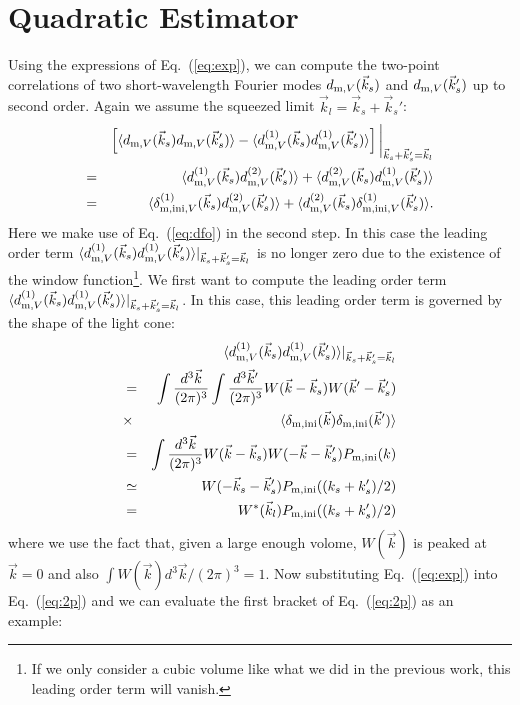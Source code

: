 \documentclass[prd,amsmath,amssymb,floatfix,superscriptaddress,nofootinbib,twocolumn]{revtex4-1}
\def\bea{\begin{eqnarray}}
\def\eea{\end{eqnarray}}
\newcommand{\vs}{\nonumber\\}
\newcommand{\vk}{\vec{k}}
\newcommand{\ec}[1]{Eq.~(\ref{eq:#1})}
\newcommand{\eql}[1]{\label{eq:#1}}
\begin{document}
\section{Quadratic Estimator} \label{sec5}
Using the expressions of \ec{exp}, we can compute the two-point correlations of two short-wavelength Fourier modes $d_{{\rm m},V}(\vk_s)$ and $d_{{\rm m},V}(\vk_s')$ up to second order. Again we assume the squeezed limit $\vk_l=\vk_s+\vk_s'$:
\bea 
 &&\left[ \langle d_{{\rm m},V}(\vk_s)d_{{\rm m},V}(\vk_s') \rangle-\langle d^{(1)}_{{\rm m},V}(\vk_s)d^{(1)}_{{\rm m},V}(\vk_s') \rangle\right]\bigg|_{\vk_s+\vk_s'=\vk_l}\vs
 =&&\langle d^{(1)}_{{\rm m},V}(\vk_s)d^{(2)}_{{\rm m},V}(\vk_s') \rangle+\langle d^{(2)}_{{\rm m},V}(\vk_s)d^{(1)}_{{\rm m},V}(\vk_s') \rangle \vs
 =&&\langle \delta_{{\rm m,ini},V}^{(1)}(\vk_s)d^{(2)}_{{\rm m},V}(\vk_s') \rangle+\langle d^{(2)}_{{\rm m},V}(\vk_s)\delta_{{\rm m,ini},V}^{(1)}(\vk_s') \rangle . \eql{2p}
\eea 
Here we make use of \ec{dfo} in the second step. In this case the leading order term $\langle d^{(1)}_{{\rm m},V}(\vk_s)d^{(1)}_{{\rm m},V}(\vk_s') \rangle|_{\vk_s+\vk_s'=\vk_l}$ is no longer zero due to the existence of the window function\footnote{If we only consider a cubic volume like what we did in the previous work, this leading order term will vanish.}. 
We first want to compute the leading order term $\langle d_{{\rm m},V}^{(1)}(\vec{k}_s)d_{{\rm m},V}^{(1)}(\vec{k}'_s) \rangle|_{\vk_s+\vk_s'=\vk_l} $. In this case, this leading order term is governed by the shape of the light cone: 
\begin{eqnarray}
&&\langle d_{{\rm m},V}^{(1)}(\vec{k}_s)d_{{\rm m},V}^{(1)}(\vec{k}'_s) \rangle|_{\vk_s+\vk_s'=\vk_l} \nonumber \\ 
&=&\int \frac{d^3 \vec{k}}{(2\pi)^3}\int \frac{d^3 \vec{k}'}{(2\pi)^3} {W}(\vec{k}-\vec{k}_s){W}(\vec{k}'-\vec{k}'_s)\vs
&\times &\langle \delta_{\rm m,ini}(\vec{k})\delta_{\rm m,ini}(\vec{k}')\rangle \nonumber \\
&=& \int \frac{d^3 \vec{k}}{(2\pi)^3}{W}(\vec{k}-\vec{k}_s){W}(-\vec{k}-\vec{k}'_s)P_{\rm m,ini}(k) \nonumber \\
&\simeq & {W}(-\vec{k}_s-\vec{k}'_s)P_{\rm m,ini}(({k}_s +{k}'_s)/2)\nonumber \\
&=&{W}^{*}(\vec{k}_l)P_{\rm m,ini}(({k}_s +{k}'_s)/2) \eql{oo}
\end{eqnarray}
where we use the fact that, given a large enough volome, $W(\vec{k})$ is peaked at $\vk=0$ and also $\int W(\vk){d^3 \vec{k}}/{(2\pi)^3}=1$.
Now substituting \ec{exp} into \ec{2p} and we can evaluate the first bracket of \ec{2p} as an example:
\end{document}
